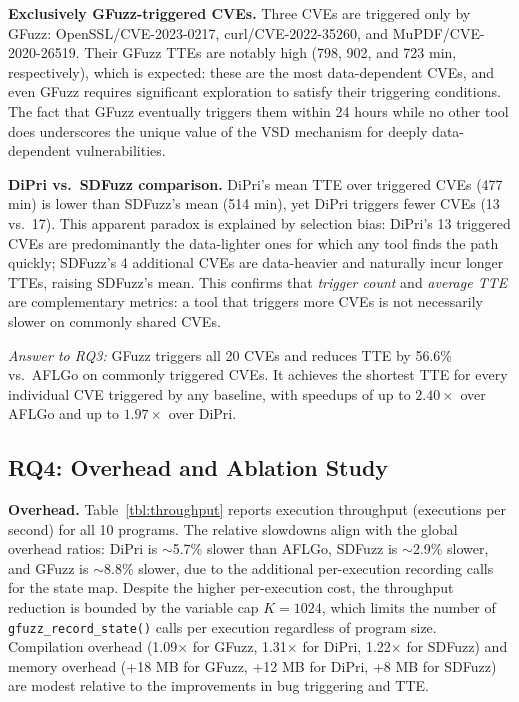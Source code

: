 \documentclass[preprint,12pt,3p]{elsarticle}
\begin{document}
\textbf{Exclusively GFuzz-triggered CVEs.}
Three CVEs are triggered only by GFuzz: OpenSSL/CVE-2023-0217,
curl/CVE-2022-35260, and MuPDF/CVE-2020-26519.  Their GFuzz TTEs are
notably high (798, 902, and 723 min, respectively), which is expected: these
are the most data-dependent CVEs, and even GFuzz requires significant
exploration to satisfy their triggering conditions.  The fact that GFuzz
eventually triggers them within 24 hours while no other tool does underscores
the unique value of the VSD mechanism for deeply data-dependent
vulnerabilities.

\textbf{DiPri vs.\ SDFuzz comparison.}
DiPri's mean TTE over triggered CVEs (477 min) is lower than SDFuzz's mean
(514 min), yet DiPri triggers fewer CVEs (13 vs.\ 17).  This apparent
paradox is explained by selection bias: DiPri's 13 triggered CVEs are
predominantly the data-lighter ones for which any tool finds the path quickly;
SDFuzz's 4 additional CVEs are data-heavier and naturally incur longer TTEs,
raising SDFuzz's mean.  This confirms that \emph{trigger count} and
\emph{average TTE} are complementary metrics: a tool that triggers more
CVEs is not necessarily slower on commonly shared CVEs.

\textit{Answer to RQ3:} GFuzz triggers all 20 CVEs and reduces TTE by
56.6\% vs.\ AFLGo on commonly triggered CVEs.  It achieves the shortest TTE
for every individual CVE triggered by any baseline, with speedups of up to
$2.40\times$ over AFLGo and up to $1.97\times$ over DiPri.

\subsection{RQ4: Overhead and Ablation Study}

\textbf{Overhead.}  Table~\ref{tbl:throughput} reports execution throughput
(executions per second) for all 10 programs.  The relative slowdowns align
with the global overhead ratios: DiPri is $\sim$5.7\% slower than AFLGo,
SDFuzz is $\sim$2.9\% slower, and GFuzz is $\sim$8.8\% slower, due to the
additional per-execution recording calls for the state map.  Despite the
higher per-execution cost, the throughput reduction is bounded by the
variable cap $K = 1024$, which limits the number of
\texttt{gfuzz\_record\_state()} calls per execution regardless of program
size.  Compilation overhead (1.09$\times$ for GFuzz, 1.31$\times$ for DiPri,
1.22$\times$ for SDFuzz) and memory overhead (+18 MB for GFuzz, +12 MB for
DiPri, +8 MB for SDFuzz) are modest relative to the improvements in bug
triggering and TTE.
\end{document}
